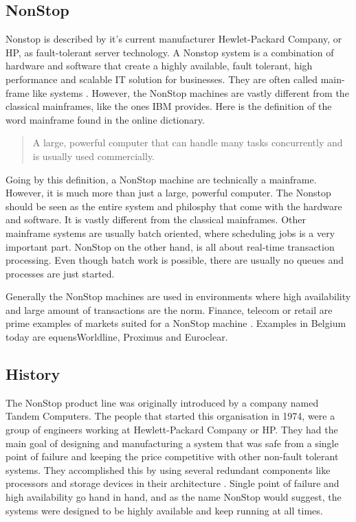 \subsection{NonStop}
Nonstop is described by it's current manufacturer Hewlet-Packard Company, or HP, as fault-tolerant server technology. A Nonstop system is
a combination of hardware and software that create a highly available, fault tolerant, high performance and scalable IT solution for businesses.
They are often called main-frame like systems \autocite{hpnonstop}. However, the NonStop machines are vastly different from the classical mainframes, like the ones IBM provides.
Here is the definition of the word mainframe found in the \cite{mainframedef} online dictionary.
\begin{quote}
	A large, powerful computer that can handle many tasks concurrently and is usually used commercially.
\end{quote}

Going by this definition, a NonStop machine are technically a mainframe. However, it is much more than just a large, powerful computer.
The Nonstop should be seen as the entire system and philosphy that come with the hardware and software. 
It is vastly different from the classical mainframes. Other mainframe systems are usually
batch oriented, where scheduling jobs is a very important part. NonStop on the other hand, is all about real-time transaction processing.
Even though batch work is possible, there are usually no queues and processes are just started.

Generally the NonStop machines are used in environments where high availability and large amount of transactions
are the norm. Finance, telecom or retail are prime examples of markets suited for a NonStop machine \autocite{hpnonstop}. Examples in Belgium today
are equensWorldline, Proximus and Euroclear. 

\subsection{History}
The NonStop product line was originally introduced by a company named Tandem Computers. 
The people that started this organisation in 1974, were a group of engineers working at Hewlett-Packard Company or HP. They had the main goal
of designing and manufacturing a system that was safe from a single point of failure and keeping the price
competitive with other non-fault tolerant systems. They accomplished this by using several redundant components
like processors and storage devices in their architecture \autocite{nonstophistory}. Single point of failure and high availability go hand in hand,
and as the name NonStop would suggest, the systems were designed to be highly available and keep running at all times.

